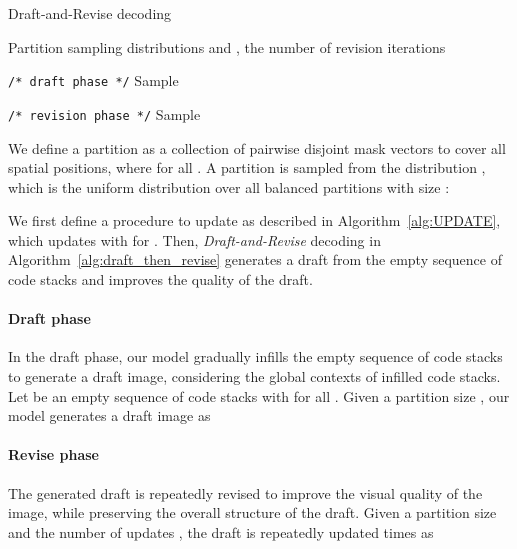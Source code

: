 \documentclass{article}
\begin{document}
\begin{algorithm}[t]
\caption{Draft-and-Revise decoding}
\label{alg:draft_then_revise}
\begin{algorithmic}[1]
\Require Partition sampling distributions  and , the number of revision iterations 
\item[] {\color{gray} \texttt{/* draft phase */}}
\State 
{}
\State Sample 
\State  

\item[] {\color{gray} \texttt{/* revision phase */}}
\State 
\For{}
    \State Sample 
    \State 
\EndFor
\State \Return 
\end{algorithmic}
\end{algorithm}


We define a partition  as a collection of pairwise disjoint  mask vectors to cover all spatial positions, where  for all .
A partition  is sampled from the distribution , which is the uniform distribution over all balanced partitions with size :


We first define a procedure  to update  as described in Algorithm~\ref{alg:UPDATE}, which updates  with  for .
Then, \emph{Draft-and-Revise} decoding in Algorithm~\ref{alg:draft_then_revise} generates a draft from the empty sequence of code stacks and improves the quality of the draft.

\paragraph{Draft phase} 
In the draft phase, our model gradually infills the empty sequence of code stacks to generate a draft image, considering the global contexts of infilled code stacks.
Let  be an empty sequence of code stacks with  for all . Given a partition size , our model generates a draft image as 


\paragraph{Revise phase} 
The generated draft  is repeatedly revised to improve the visual quality of the image, while preserving the overall structure of the draft.
Given a partition size  and the number of updates , the draft  is repeatedly updated  times as 
\end{document}
